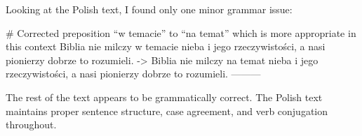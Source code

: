 Looking at the Polish text, I found only one minor grammar issue:

# Corrected preposition “w temacie” to “na temat” which is more appropriate in this context
Biblia nie milczy w temacie nieba i jego rzeczywistości, a nasi pionierzy dobrze to rozumieli.
->
Biblia nie milczy na temat nieba i jego rzeczywistości, a nasi pionierzy dobrze to rozumieli.
---------

The rest of the text appears to be grammatically correct. The Polish text maintains proper sentence structure, case agreement, and verb conjugation throughout.